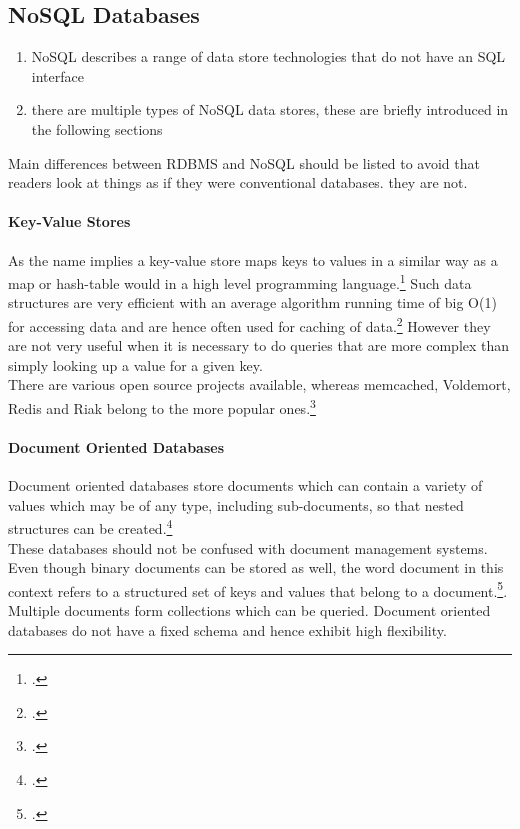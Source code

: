 \subsection{NoSQL Databases}
\label{sec:nosql}

\begin{enumerate}
  \item NoSQL describes a range of data store technologies that do not have an SQL interface
  \item there are multiple types of NoSQL data stores, these are briefly introduced in the following sections
\end{enumerate}
Main differences between RDBMS and NoSQL should be listed to avoid that readers
look at things as if they were conventional databases. they are not.

\paragraph{Key-Value Stores}
\label{sec:nosql-key-value}
As the name implies a key-value store maps keys to values in a similar way as a
map or hash-table would in a high level programming
language.\footcite[Cf.][4]{Redmond_2012} Such data structures are very efficient
with an average algorithm running time of big O(1) for accessing data and
are hence often used for caching of data.\footcite[Cf.][p. 14 et sq.]{Tiwari_2011}
However they are not very useful when it is necessary to do queries that are
more complex than simply looking up a value for a given key.\\
There are various open source projects available, whereas memcached, Voldemort,
Redis and Riak belong to the more popular ones.\footcite[Cf.][4]{Redmond_2012}

 
\paragraph{Document Oriented Databases}
\label{sec:nosql-document}
Document oriented databases store documents which can contain a variety of
values which may be of any type, including sub-documents, so that nested 
structures can be created.\footcite[Cf.][p. 5 et sq.]{Redmond_2012}\\
These databases should not be confused with document management systems. Even
though binary documents can be stored as well, the word document in this context
refers to a structured set of keys and values that belong to a
document.\footcite[Cf.][p. 18 et sq.]{Tiwari_2011}.\\
Multiple documents form collections which can be queried. Document oriented
databases do not have a fixed schema and hence exhibit high flexibility.

